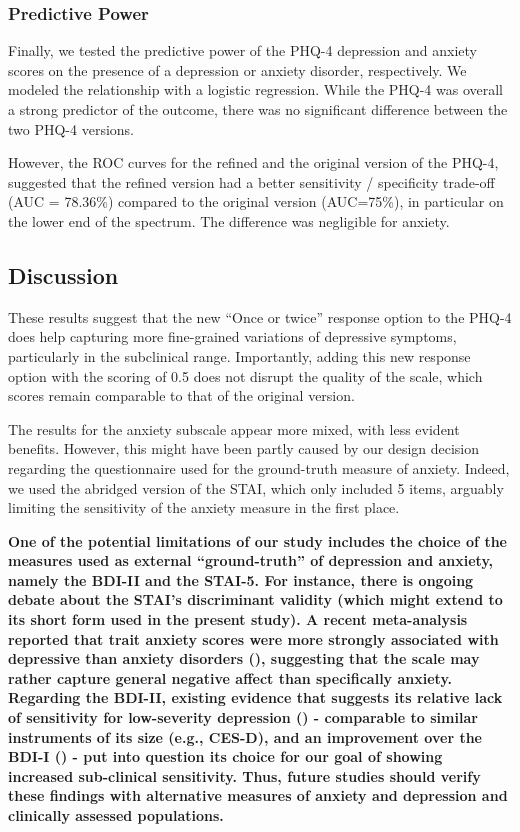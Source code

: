 \documentclass[
  jou,
  longtable,
  nolmodern,
  notxfonts,
  notimes,
  mask,
  colorlinks=true,linkcolor=blue,citecolor=blue,urlcolor=blue]{apa7}
\begin{document}
\subsubsection{Predictive Power}\label{predictive-power}

Finally, we tested the predictive power of the PHQ-4 depression and
anxiety scores on the presence of a depression or anxiety disorder,
respectively. We modeled the relationship with a logistic regression.
While the PHQ-4 was overall a strong predictor of the outcome, there was
no significant difference between the two PHQ-4 versions.

However, the ROC curves for the refined and the original version of the
PHQ-4, suggested that the refined version had a better sensitivity /
specificity trade-off (AUC = 78.36\%) compared to the original version
(AUC=75\%), in particular on the lower end of the spectrum. The
difference was negligible for anxiety.

\subsection{Discussion}\label{discussion-1}

These results suggest that the new ``Once or twice'' response option to
the PHQ-4 does help capturing more fine-grained variations of depressive
symptoms, particularly in the subclinical range. Importantly, adding
this new response option with the scoring of 0.5 does not disrupt the
quality of the scale, which scores remain comparable to that of the
original version.

The results for the anxiety subscale appear more mixed, with less
evident benefits. However, this might have been partly caused by our
design decision regarding the questionnaire used for the ground-truth
measure of anxiety. Indeed, we used the abridged version of the STAI,
which only included 5 items, arguably limiting the sensitivity of the
anxiety measure in the first place.

\textbf{One of the potential limitations of our study includes the
choice of the measures used as external ``ground-truth'' of depression
and anxiety, namely the BDI-II and the STAI-5. For instance, there is
ongoing debate about the STAI's discriminant validity (which might
extend to its short form used in the present study). A recent
meta-analysis reported that trait anxiety scores were more strongly
associated with depressive than anxiety disorders
(),
suggesting that the scale may rather capture general negative affect
than specifically anxiety. Regarding the BDI-II, existing evidence that
suggests its relative lack of sensitivity for low-severity depression
() - comparable to
similar instruments of its size (e.g., CES-D), and an improvement over
the BDI-I () -
put into question its choice for our goal of showing increased
sub-clinical sensitivity. Thus, future studies should verify these
findings with alternative measures of anxiety and depression and
clinically assessed populations.}
\end{document}
